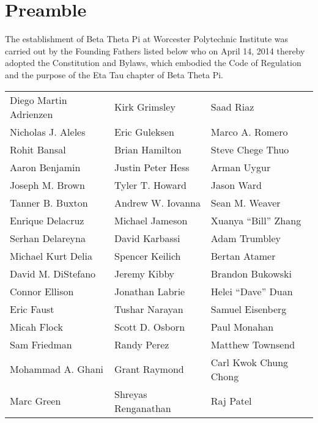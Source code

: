 \section*{Preamble}
\label{sec:preamble}

The establishment of Beta Theta Pi at Worcester Polytechnic Institute was
carried out by the Founding Fathers listed below who on April 14, 2014 thereby
adopted the Constitution and Bylaws, which embodied the Code of Regulation and
the purpose of the Eta Tau chapter of Beta Theta Pi.

\bigskip

\begin{tabular}[h]{l l l}
	Diego Martin Adrienzen & Kirk Grimsley & Saad Riaz \\
	Nicholas J. Aleles & Eric Guleksen & Marco A. Romero \\
	Rohit Bansal & Brian Hamilton & Steve Chege Thuo \\
	Aaron Benjamin & Justin Peter Hess & Arman Uygur \\
	Joseph M. Brown & Tyler T. Howard & Jason Ward \\
	Tanner B. Buxton & Andrew W. Iovanna & Sean M. Weaver \\
	Enrique Delacruz & Michael Jameson & Xuanya ``Bill'' Zhang \\
	Serhan Delareyna & David Karbassi & Adam Trumbley \\
	Michael Kurt Delia & Spencer Keilich & Bertan Atamer \\
	David M. DiStefano & Jeremy Kibby & Brandon Bukowski \\
	Connor Ellison & Jonathan Labrie & Helei ``Dave'' Duan \\
	Eric Faust & Tushar Narayan & Samuel Eisenberg \\
	Micah Flock & Scott D. Osborn & Paul Monahan \\
	Sam Friedman & Randy Perez & Matthew Townsend \\
	Mohammad A. Ghani & Grant Raymond & Carl Kwok Chung Chong \\
	Marc Green & Shreyas Renganathan & Raj Patel \\
\end{tabular}


